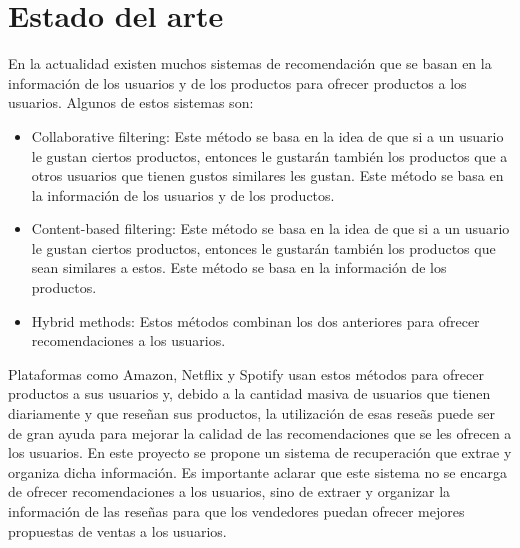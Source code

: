 \documentclass{llncs}
\begin{document}
\section{Estado del arte}
    En la actualidad existen muchos sistemas de recomendaci\'on que se basan en la informaci\'on de los usuarios y de los productos para ofrecer productos a los usuarios. Algunos de estos sistemas son:
    \begin{itemize}
        \item Collaborative filtering: Este m\'etodo se basa en la idea de que si a un usuario le gustan ciertos productos, entonces le gustar\'an tambi\'en los productos que a otros usuarios que tienen gustos similares les gustan. Este m\'etodo se basa en la informaci\'on de los usuarios y de los productos.
        \item Content-based filtering: Este m\'etodo se basa en la idea de que si a un usuario le gustan ciertos productos, entonces le gustar\'an tambi\'en los productos que sean similares a estos. Este m\'etodo se basa en la informaci\'on de los productos.
        \item Hybrid methods: Estos m\'etodos combinan los dos anteriores para ofrecer recomendaciones a los usuarios.
    \end{itemize}
    Plataformas como Amazon, Netflix y Spotify usan estos m\'etodos para ofrecer productos a sus usuarios y, debido a la cantidad masiva de usuarios que tienen diariamente y que rese\~nan sus productos, la utilizaci\'on de esas rese\~as puede ser de gran ayuda para mejorar la calidad de las recomendaciones que se les ofrecen a los usuarios.
    En este proyecto se propone un sistema de recuperaci\'on que extrae y organiza dicha informaci\'on. Es importante aclarar que este sistema no se encarga de ofrecer recomendaciones a los usuarios, sino de extraer y organizar la informaci\'on de las rese\~nas para que los vendedores puedan ofrecer mejores propuestas de ventas a los usuarios.
\end{document}
